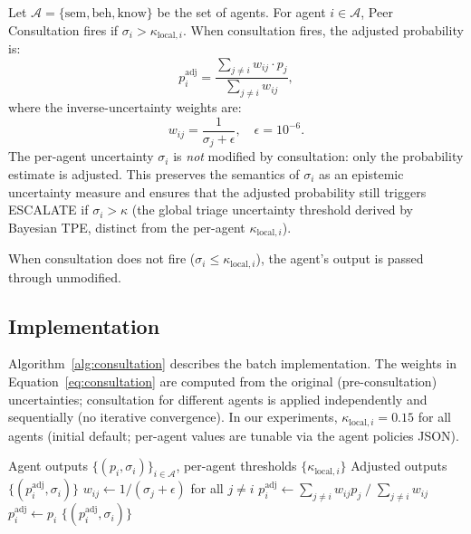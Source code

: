 \documentclass[journal]{IEEEtran}
\newcommand{\sem}{\mathrm{sem}}
\newcommand{\beh}{\mathrm{beh}}
\newcommand{\know}{\mathrm{know}}
\begin{document}
Let $\mathcal{A} = \{\sem, \beh, \know\}$ be the set of agents.
For agent $i \in \mathcal{A}$, Peer Consultation fires if
$\sigma_i > \kappa_{\mathrm{local},i}$.
When consultation fires, the adjusted probability is:
\begin{equation}
  p_i^{\mathrm{adj}} = \frac{\sum_{j \neq i} w_{ij} \cdot p_j}
                            {\sum_{j \neq i} w_{ij}},
  \label{eq:consultation}
\end{equation}
where the inverse-uncertainty weights are:
\begin{equation}
  w_{ij} = \frac{1}{\sigma_j + \epsilon},
  \quad \epsilon = 10^{-6}.
\end{equation}
The per-agent uncertainty $\sigma_i$ is \emph{not} modified by consultation:
only the probability estimate is adjusted.
This preserves the semantics of $\sigma_i$ as an epistemic uncertainty
measure and ensures that the adjusted probability still triggers
ESCALATE if $\sigma_i > \kappa$ (the global triage uncertainty threshold derived by Bayesian TPE, distinct from the per-agent $\kappa_{\mathrm{local},i}$).

When consultation does not fire ($\sigma_i \leq \kappa_{\mathrm{local},i}$),
the agent's output is passed through unmodified.

\subsection{Implementation}

Algorithm~\ref{alg:consultation} describes the batch implementation.
The weights in Equation~\eqref{eq:consultation} are computed from the
original (pre-consultation) uncertainties; consultation for different
agents is applied independently and sequentially (no iterative convergence).
In our experiments, $\kappa_{\mathrm{local},i} = 0.15$ for all agents
(initial default; per-agent values are tunable via the agent policies JSON).

\begin{algorithm}[t]
\caption{Peer Consultation (batch)}
\label{alg:consultation}
\begin{algorithmic}[1]
\Require Agent outputs $\{(p_i, \sigma_i)\}_{i \in \mathcal{A}}$,
         per-agent thresholds $\{\kappa_{\mathrm{local},i}\}$
\Ensure Adjusted outputs $\{(p_i^{\mathrm{adj}}, \sigma_i)\}$
    \State $w_{ij} \gets 1/(\sigma_j + \epsilon)$ for all $j \neq i$
    \State $p_i^{\mathrm{adj}} \gets \sum_{j \neq i} w_{ij} p_j \;/\; \sum_{j \neq i} w_{ij}$
  \Else
    \State $p_i^{\mathrm{adj}} \gets p_i$
  \EndIf
\EndFor
\Return $\{(p_i^{\mathrm{adj}}, \sigma_i)\}$
\end{algorithmic}
\end{algorithm}
\end{document}
